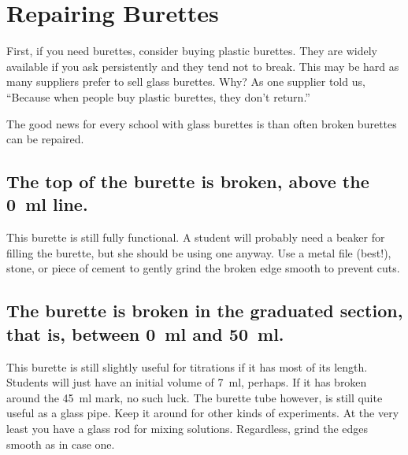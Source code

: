 \chapter{Repairing Burettes}

First, if you need burettes, consider buying plastic burettes. They are widely available if you ask persistently and they tend not to break. This may be hard as many suppliers prefer to sell glass burettes. Why? As one supplier told us, “Because when people buy plastic burettes, they don’t return.”

The good news for every school with glass burettes is than often broken burettes can be repaired.

\section{The top of the burette is broken, 
above the 0~ml line.}

This burette is still fully functional. 
A student will probably need a beaker for filling the burette, 
but she should be using one anyway. 
Use a metal file (best!), 
stone, 
or piece of cement to gently grind the broken edge smooth to prevent cuts.

\section{The burette is broken in the graduated section, 
that is, 
between 0~ml and 50~ml.}
This burette is still slightly useful for titrations 
if it has most of its length. 
Students will just have an initial volume of 7~ml, 
perhaps. 
If it has broken around the 45~ml mark, 
no such luck. 
The burette tube however, 
is still quite useful as a glass pipe. 
Keep it around for other kinds of experiments. 
At the very least you have a glass rod for mixing solutions. 
Regardless, 
grind the edges smooth as in case one.

